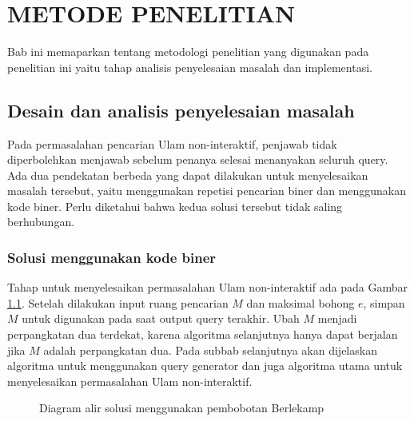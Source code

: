 \chapter{METODE PENELITIAN}

Bab ini memaparkan tentang metodologi penelitian yang digunakan pada penelitian ini yaitu tahap analisis penyelesaian masalah dan implementasi.

\section{Desain dan analisis penyelesaian masalah}

Pada permasalahan pencarian Ulam non-interaktif, penjawab tidak diperbolehkan menjawab sebelum penanya selesai menanyakan seluruh query. Ada dua pendekatan berbeda yang dapat dilakukan untuk menyelesaikan masalah tersebut, yaitu menggunakan repetisi pencarian biner dan menggunakan kode biner. Perlu diketahui bahwa kedua solusi tersebut tidak saling berhubungan.

\subsection{Solusi menggunakan kode biner}

Tahap untuk menyelesaikan permasalahan Ulam non-interaktif ada pada Gambar \ref{fig:flow_binarycode}. Setelah dilakukan input ruang pencarian $M$ dan maksimal bohong $e$, simpan $M$ untuk digunakan pada saat output query terakhir. Ubah $M$ menjadi perpangkatan dua terdekat, karena algoritma selanjutnya hanya dapat berjalan jika $M$ adalah perpangkatan dua. Pada subbab selanjutnya akan dijelaskan algoritma untuk menggunakan query generator dan juga algoritma utama untuk menyelesaikan permasalahan Ulam non-interaktif.

\begin{figure}
\centering
{}
\caption{Diagram alir solusi menggunakan pembobotan Berlekamp}
\label{fig:flow_binarycode}
\end{figure}

